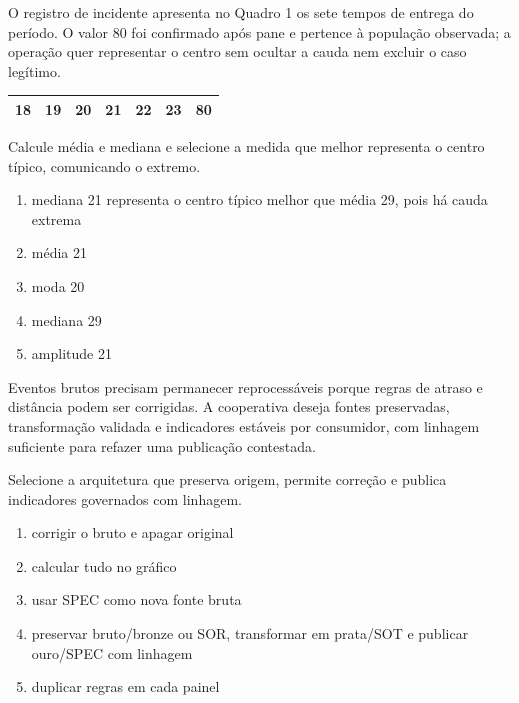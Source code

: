 
\TextoBase

O registro de incidente apresenta no Quadro 1 os sete tempos de entrega do período. O valor 80 foi confirmado após pane e pertence à população observada; a operação quer representar o centro sem ocultar a cauda nem excluir o caso legítimo.
\begin{DocumentBox}
\centering\begin{tabular}{@{}rrrrrrr@{}}\toprule
18 & 19 & 20 & 21 & 22 & 23 & 80\\\bottomrule
\end{tabular}
\end{DocumentBox}

\FonteDidatica

\Comando Calcule média e mediana e selecione a medida que melhor representa o centro típico, comunicando o extremo.

\begin{enumerate}[label=\Alph*)]

\item mediana 21 representa o centro típico melhor que média 29, pois há cauda extrema

\item média 21

\item moda 20

\item mediana 29

\item amplitude 21

\end{enumerate}


\TextoBase

Eventos brutos precisam permanecer reprocessáveis porque regras de atraso e distância podem ser corrigidas. A cooperativa deseja fontes preservadas, transformação validada e indicadores estáveis por consumidor, com linhagem suficiente para refazer uma publicação contestada.

\FonteDidatica

\Comando Selecione a arquitetura que preserva origem, permite correção e publica indicadores governados com linhagem.

\begin{enumerate}[label=\Alph*)]

\item corrigir o bruto e apagar original

\item calcular tudo no gráfico

\item usar SPEC como nova fonte bruta

\item preservar bruto/bronze ou SOR, transformar em prata/SOT e publicar ouro/SPEC com linhagem

\item duplicar regras em cada painel

\end{enumerate}

